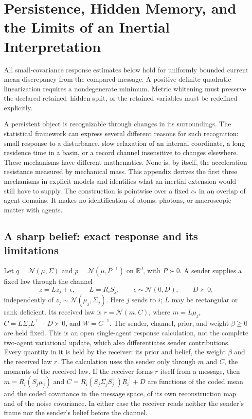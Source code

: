 \section{Persistence, Hidden Memory, and the Limits of an Inertial Interpretation}

All small-covariance response estimates below hold for uniformly bounded current mean discrepancy from the compared message. A positive-definite quadratic linearization requires a nondegenerate minimum. Metric whitening must preserve the declared retained--hidden split, or the retained variables must be redefined explicitly.
\label{app:examples}

A persistent object is recognizable through changes in its surroundings. The statistical framework can express several different reasons for such recognition: small response to a disturbance, slow relaxation of an internal coordinate, a long residence time in a basin, or a record channel insensitive to changes elsewhere. These mechanisms have different mathematics. None is, by itself, the acceleration resistance measured by mechanical mass. This appendix derives the first three mechanisms in explicit models and identifies what an inertial extension would still have to supply. The construction is pointwise over a fixed $c_*$ in an overlap of agent domains. It makes no identification of atoms, photons, or macroscopic matter with agents.

\subsection{A sharp belief: exact response and its limitations}
\label{sec:rock_derivations}

Let $q=\mathcal N(\mu,\Sigma)$ and $p=\mathcal N(\bar\mu,P^{-1})$ on $\mathbb R^d$, with $P\succ0$. A sender supplies a fixed law through the channel
\begin{equation}
 z=Lz_j+\epsilon,\qquad L=R_iS_j,\qquad
 \epsilon\sim\mathcal N(0,D),\qquad D\succ0,
 \label{eq:persistence_message}
\end{equation}
independently of $z_j\sim\mathcal N(\mu_j,\Sigma_j)$. Here $j$ sends to $i$; $L$ may be rectangular or rank deficient. Its received law is $r=\mathcal N(m,C)$, where $m=L\mu_j$, $C=L\Sigma_jL^\top+D\succ0$, and $W=C^{-1}$. The sender, channel, prior, and weight $\beta\ge0$ are held fixed. This is an open single-agent response calculation, not the complete two-agent variational update, which also differentiates sender contributions. Every quantity in it is held by the receiver: its prior and belief, the weight $\beta$ and the received law $r$. The calculation uses the sender only through $m$ and $C$, the moments of the received law. If the receiver forms $r$ itself from a message, then $m=R_i(S_j\mu_j)$ and $C=R_i(S_j\Sigma_jS_j^\top)R_i^\top+D$ are functions of the coded mean and the coded covariance in the message space, of its own reconstruction map and of the noise covariance. In either case the receiver reads neither the sender's frame nor the sender's belief before the channel.

